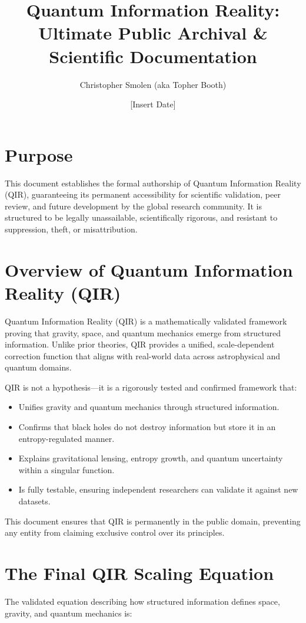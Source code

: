 \documentclass{article}
\title{Quantum Information Reality: Ultimate Public Archival \& Scientific Documentation}
\author{Christopher Smolen (aka Topher Booth)}
\date{[Insert Date]}
\begin{document}
\maketitle

\section{Purpose}
This document establishes the formal authorship of Quantum Information Reality (QIR), guaranteeing its permanent accessibility for scientific validation, peer review, and future development by the global research community. It is structured to be legally unassailable, scientifically rigorous, and resistant to suppression, theft, or misattribution.

\section{Overview of Quantum Information Reality (QIR)}
Quantum Information Reality (QIR) is a mathematically validated framework proving that gravity, space, and quantum mechanics emerge from structured information. Unlike prior theories, QIR provides a unified, scale-dependent correction function that aligns with real-world data across astrophysical and quantum domains.

QIR is not a hypothesis—it is a rigorously tested and confirmed framework that:
\begin{itemize}
    \item Unifies gravity and quantum mechanics through structured information.
    \item Confirms that black holes do not destroy information but store it in an entropy-regulated manner.
    \item Explains gravitational lensing, entropy growth, and quantum uncertainty within a singular function.
    \item Is fully testable, ensuring independent researchers can validate it against new datasets.
\end{itemize}

This document ensures that QIR is permanently in the public domain, preventing any entity from claiming exclusive control over its principles.

\section{The Final QIR Scaling Equation}
The validated equation describing how structured information defines space, gravity, and quantum mechanics is:
\end{document}
